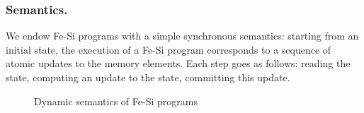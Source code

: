 \documentclass{llncs}
\begin{document}
\subsubsection{Semantics.}
We endow Fe-Si programs with a simple synchronous semantics:  starting
from an initial state, the execution of a Fe-Si program corresponds
to a sequence of atomic updates to the memory elements. 
%
Each step goes as follows: reading the state, computing an update to
the state, committing this update.
%

\begin{figure*}
  \centering
\caption{Dynamic semantics of Fe-Si programs}\label{fig:fesi-sem}
\end{figure*}
\end{document}
